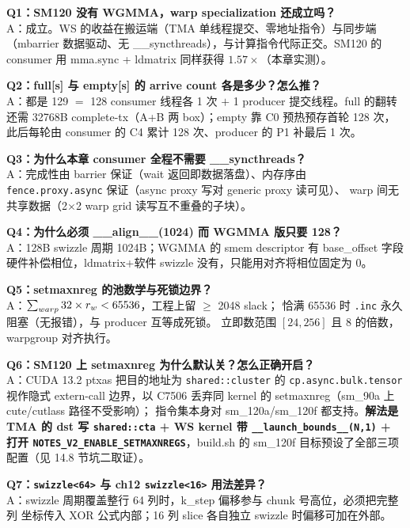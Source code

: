 \textbf{Q1：SM120 没有 WGMMA，warp specialization 还成立吗？}\\
A：成立。WS 的收益在搬运端（TMA 单线程提交、零地址指令）与同步端
（mbarrier 数据驱动、无 \_\_syncthreads），与计算指令代际正交。SM120 的
consumer 用 mma.sync + ldmatrix 同样获得 $1.57\times$（本章实测）。

\textbf{Q2：full[s] 与 empty[s] 的 arrive count 各是多少？怎么推？}\\
A：都是 129 $=$ 128 consumer 线程各 1 次 $+$ 1 producer 提交线程。full 的翻转
还需 32768B complete-tx（A+B 两 box）；empty 靠 C0 预热预存首轮 128 次，
此后每轮由 consumer 的 C4 累计 128 次、producer 的 P1 补最后 1 次。

\textbf{Q3：为什么本章 consumer 全程不需要 \_\_syncthreads？}\\
A：完成性由 barrier 保证（wait 返回即数据落盘）、内存序由
\texttt{fence.\allowbreak{}proxy.\allowbreak{}async} 保证（async proxy 写对 generic proxy 读可见）、
warp 间无共享数据（2$\times$2 warp grid 读写互不重叠的子块）。

\textbf{Q4：为什么必须 \_\_align\_\_(1024) 而 WGMMA 版只要 128？}\\
A：128B swizzle 周期 1024B；WGMMA 的 smem descriptor 有 base\_offset 字段
硬件补偿相位，ldmatrix+软件 swizzle 没有，只能用对齐将相位固定为 0。

\textbf{Q5：setmaxnreg 的池数学与死锁边界？}\\
A：$\sum\sb{warp} 32 \times r\sb{w} < 65536$，工程上留 $\ge$ 2048 slack；
恰满 65536 时 \texttt{.inc} 永久阻塞（无报错），与 producer 互等成死锁。
立即数范围 $[24, 256]$ 且 8 的倍数，warpgroup 对齐执行。

\textbf{Q6：SM120 上 setmaxnreg 为什么默认关？怎么正确开启？}\\
A：CUDA 13.2 ptxas 把目的地址为 \texttt{shared::cluster} 的
\texttt{cp.\allowbreak{}async.\allowbreak{}bulk.\allowbreak{}tensor} 视作隐式 extern-call 边界，以 C7506
丢弃同 kernel 的 setmaxnreg（sm\_90a 上 cute/cutlass 路径不受影响）；
指令集本身对 sm\_120a/sm\_120f 都支持。\textbf{解法是 TMA 的 dst 写
\texttt{shared::cta} + WS kernel 带
\texttt{\_\_launch\_bounds\_\_(N,1)} + 打开
\texttt{NOTES\_\allowbreak{}V2\_\allowbreak{}ENABLE\_\allowbreak{}SETMAXNREGS}}，build.sh 的 sm\_120f
目标预设了全部三项配置（见 14.8 节坑二取证）。

\textbf{Q7：\texttt{swizzle<64>} 与 ch12 \texttt{swizzle<16>} 用法差异？}\\
A：swizzle 周期覆盖整行 64 列时，k\_step 偏移参与 chunk 号高位，必须把完整列
坐标传入 XOR 公式内部；16 列 slice 各自独立 swizzle 时偏移可加在外部。

